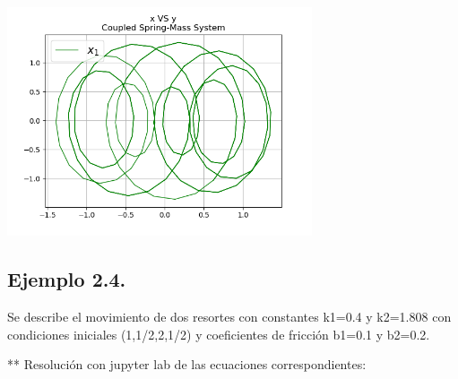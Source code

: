 \documentclass{article} %
\begin{document}
\begin{center}
 	\includegraphics[width=9cm]{two_springs3-4.png}
 \end{center}


\subsection{Ejemplo 2.4.}
Se describe el movimiento de dos resortes con constantes k1=0.4 y k2=1.808 con condiciones iniciales (1,1/2,2,1/2) y coeficientes de fricción b1=0.1 y b2=0.2.

\vspace{0.5 cm}

** Resolución con jupyter lab de las ecuaciones correspondientes:
\end{document}
